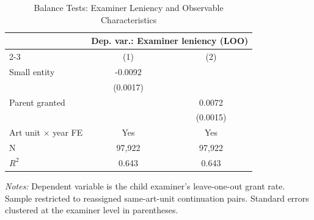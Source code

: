 \begin{table}[t]
\centering
\caption{Balance Tests: Examiner Leniency and Observable Characteristics}
\label{tab:balance}
\begin{tabular}{lcc}
\hline\hline
 & \multicolumn{2}{c}{Dep. var.: Examiner leniency (LOO)} \\
\cmidrule(lr){2-3}
 & (1) & (2) \\
\hline
Small entity & -0.0092 & \\
 & (0.0017) & \\
Parent granted & & 0.0072 \\
 & & (0.0015) \\
\hline
Art unit $\times$ year FE & Yes & Yes \\
N & 97,922 & 97,922 \\
$R^2$ & 0.643 & 0.643 \\
\hline\hline
\end{tabular}
\begin{tablenotes}[flushleft]
\small
\item \textit{Notes:} Dependent variable is the child examiner's leave-one-out grant rate. Sample restricted to reassigned same-art-unit continuation pairs. Standard errors clustered at the examiner level in parentheses.
\end{tablenotes}
\end{table}

